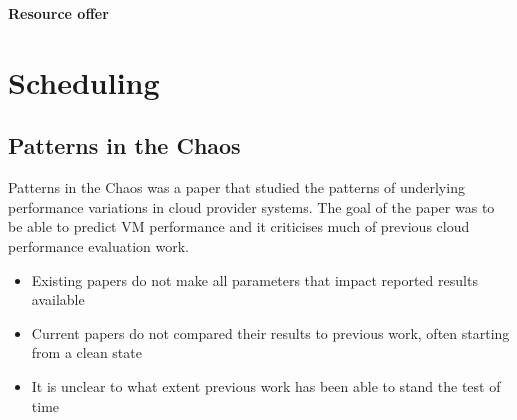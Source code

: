 \documentclass{sty/SizheArticle}
\begin{document}
\textbf{Resource offer}


\section{Scheduling}
\subsection{Patterns in the Chaos}
Patterns in the Chaos was a paper that studied the patterns of underlying
performance variations in cloud provider systems. The goal of the paper was
to be able to predict VM performance and it criticises much of previous
cloud performance evaluation work.
\begin{itemize}
\item Existing papers do not make all parameters that impact reported results
available
\item Current papers do not compared their results to previous work, often
starting from a clean state
\item It is unclear to what extent previous work has been able to stand the
test of time
\end{itemize}
\end{document}
